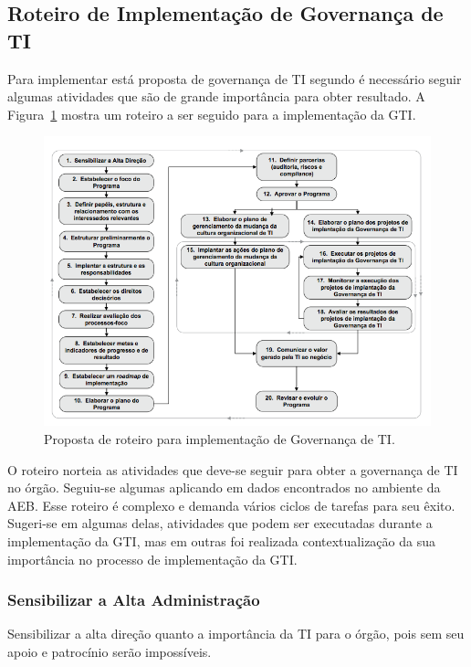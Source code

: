 \subsection{Roteiro de Implementação de Governança de TI}

Para implementar está proposta de governança de TI segundo \cite{ImplantandoGTI:2012} é necessário seguir algumas atividades que são de grande importância para obter resultado. A Figura~\ref{fig:roteiro} mostra um roteiro a ser seguido para a implementação da GTI.

\begin{figure}[ht]
\centering
\includegraphics[width=1.0\textwidth]{roteiro.png}
\caption{Proposta de roteiro para implementação de Governança de TI.}
\label{fig:roteiro}
\end{figure}

O roteiro norteia as atividades que deve-se seguir para obter a governança de TI no órgão. Seguiu-se algumas aplicando em dados encontrados no ambiente da AEB. Esse roteiro é complexo e demanda vários ciclos de tarefas para seu êxito. Sugeri-se em algumas delas, atividades que podem ser executadas durante a implementação da GTI, mas em outras foi realizada contextualização da sua importância no processo de implementação da GTI.

\subsubsection{Sensibilizar a Alta Administração}

Sensibilizar a alta direção quanto a importância da TI para o órgão, pois sem seu apoio e patrocínio serão impossíveis. 

